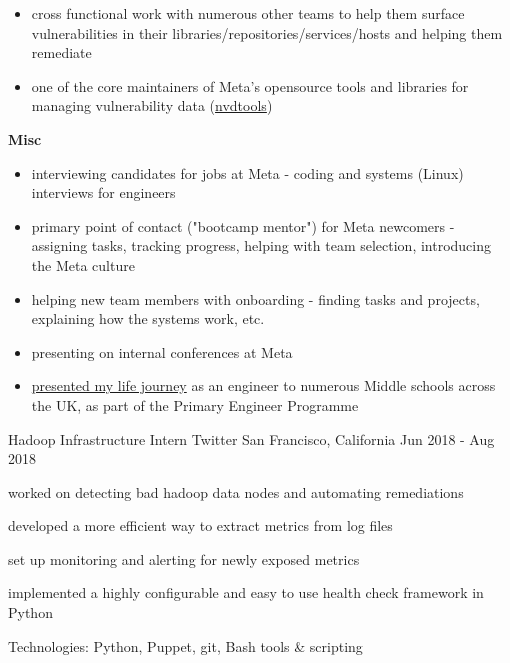 \begin{cventries}
{\begin{cvitems}
{\begin{itemize}
            \item {cross functional work with numerous other teams to help them surface vulnerabilities in their libraries/repositories/services/hosts and helping them remediate}
            \item {one of the core maintainers of Meta's opensource tools and libraries for managing vulnerability data (\href{https://github.com/facebookincubator/nvdtools}{nvdtools})}
          \end{itemize}
        }
        \item {
          \textbf{Misc}
          \begin{itemize}
            \item {interviewing candidates for jobs at Meta - coding and systems (Linux) interviews for engineers}
            \item {primary point of contact ("bootcamp mentor") for Meta newcomers - assigning tasks, tracking progress, helping with team selection, introducing the Meta culture}
            \item {helping new team members with onboarding - finding tasks and projects, explaining how the systems work, etc.}
            \item {presenting on internal conferences at Meta}
            \item {\href{https://www.youtube.com/watch?v=wP3OpdfOYok}{presented my life journey} as an engineer to numerous Middle schools across the UK, as part of the Primary Engineer Programme}
          \end{itemize}
        }
      \end{cvitems}
    }

  \cventry
    {Hadoop Infrastructure Intern} %
    {Twitter} %
    {San Francisco, California} %
    {Jun 2018 - Aug 2018} %
    {
      \begin{cvitems} %
        \item {worked on detecting bad hadoop data nodes and automating remediations}
        \item {developed a more efficient way to extract metrics from log files}
        \item {set up monitoring and alerting for newly exposed metrics}
        \item {implemented a highly configurable and easy to use health check framework in Python}
        \item {Technologies: Python, Puppet, git, Bash tools \& scripting}
      \end{cvitems}
    }


\end{cventries}

